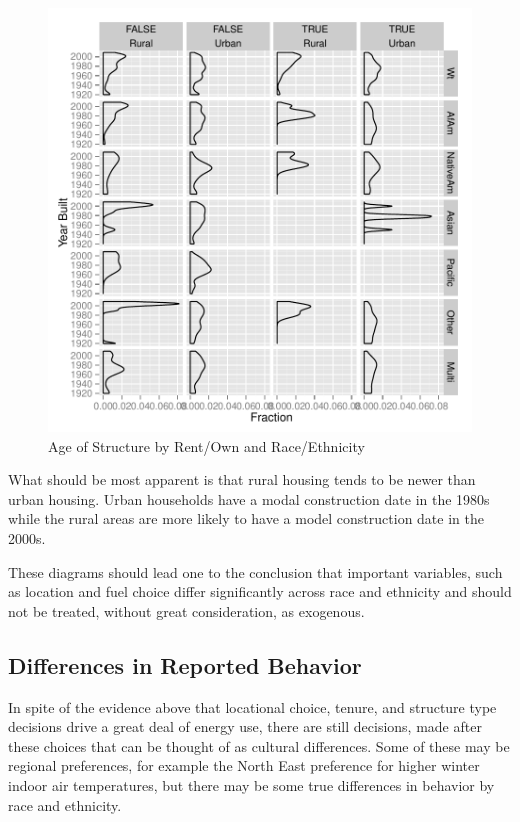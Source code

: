 \documentclass{article}
\begin{document}
\begin{figure}[htbp]
\begin{center}
\caption{Age of Structure by Rent/Own and Race/Ethnicity}
\label{fig:AgebyOwnRace}
\includegraphics{DraftEdwardsWoods-010}
\end{center}
\end{figure}

What should be most apparent is that rural housing tends to be newer than urban housing.  Urban households have a modal construction date in the 1980s while the rural areas are more likely to have a model construction date in the 2000s.

These diagrams should lead one to the conclusion that important variables, such as location and fuel choice differ significantly across race and ethnicity and should not be treated, without great consideration, as exogenous.

\subsection{Differences in Reported Behavior}
%   
% 
%   
In spite of the evidence above that locational choice, tenure, and structure type decisions drive a great deal of energy use, there are still decisions, made after these choices that can be thought of as cultural differences.  Some of these may be regional preferences, for example the North East preference for higher winter indoor air temperatures, but there may be some true differences in behavior by race and ethnicity.
\end{document}
